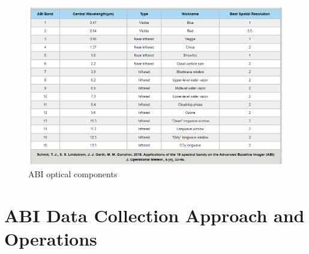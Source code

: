 \begin{figure}[H]
\begin{center}
\includegraphics[scale=0.8]{abi_band_image.png} %
\end{center}
\caption{ABI optical components}
\label{ABI optical components}%
\end{figure}
\newpage
\section{ABI Data Collection Approach and Operations}
